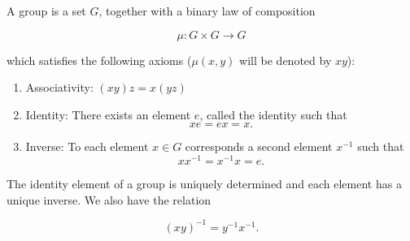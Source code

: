 A group is a set $G$, together with a binary law of composition

$$\mu: G \times G \rightarrow G$$

which satisfies the following axioms ($\mu(x, y)$ will be denoted by $xy$):

\begin{enumerate}
\item Associativity: $(xy)z = x(yz)$
\item Identity: There exists an element $e$, called the identity such that
$$xe = ex = x.$$
\item Inverse: To each element $x \in G$ corresponds a second element $x^{-1}$ such that
$$xx^{-1} = x^{-1}x = e.$$
\end{enumerate}

The identity element of a group is uniquely determined and each element has a unique inverse. We also have the relation

$$(xy)^{-1} = y^{-1}x^{-1}.$$
